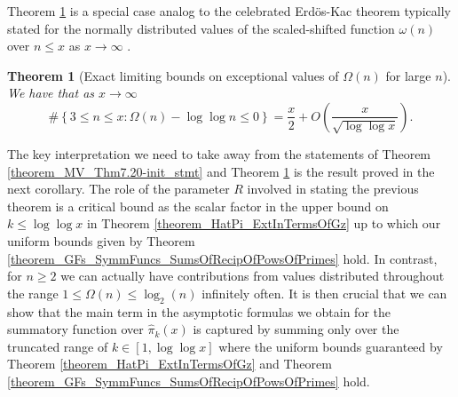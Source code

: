 \documentclass[11pt,reqno,a4letter]{article}
\numberwithin{figure}{section}
\numberwithin{table}{section}
\newcommand{\cf}{\textit{cf.\ }}
\theoremstyle{plain}
\newtheorem{theorem}{Theorem}
\numberwithin{theorem}{section}
\theoremstyle{definition}
\begin{document}
Theorem \ref{theorem_MV_Thm7.21-init_stmt} is a special case analog to the 
celebrated Erd\"os-Kac theorem typically stated for the 
normally distributed values of the scaled-shifted function $\omega(n)$ over $n \leq x$ as 
$x \rightarrow \infty$ \cite[\cf Thm.\ 7.21]{MV}. 

\begin{theorem}[Exact limiting bounds on exceptional values of $\Omega(n)$ for large $n$] 
\label{theorem_MV_Thm7.21-init_stmt} 
We have that as $x \rightarrow \infty$ 
\[
\#\left\{3 \leq n \leq x: \Omega(n) - \log\log n \leq 0\right\} = 
     \frac{x}{2} + O\left(\frac{x}{\sqrt{\log\log x}}\right). 
\]
\end{theorem} 

The key interpretation we need to take away from the statements 
of Theorem \ref{theorem_MV_Thm7.20-init_stmt} and 
Theorem \ref{theorem_MV_Thm7.21-init_stmt} 
is the result proved in the next corollary. 
The role of the parameter $R$ involved in stating the previous theorem 
is a critical bound as the scalar factor in the upper bound on $k \leq \log\log x$ in 
Theorem \ref{theorem_HatPi_ExtInTermsOfGz} up to which our uniform bounds given by 
Theorem \ref{theorem_GFs_SymmFuncs_SumsOfRecipOfPowsOfPrimes} hold. 
In contrast, for $n \geq 2$ we can actually 
have contributions from values distributed throughout the range $1 \leq \Omega(n) \leq \log_2(n)$ 
infinitely often. 
It is then crucial that we can show that the main term in the asymptotic formulas we obtain 
for the summatory function over $\widehat{\pi}_k(x)$ 
is captured by summing only over the truncated range of 
$k \in [1, \log\log x]$ where the uniform bounds 
guaranteed by Theorem \ref{theorem_HatPi_ExtInTermsOfGz} and 
Theorem \ref{theorem_GFs_SymmFuncs_SumsOfRecipOfPowsOfPrimes} hold. 
\end{document}
